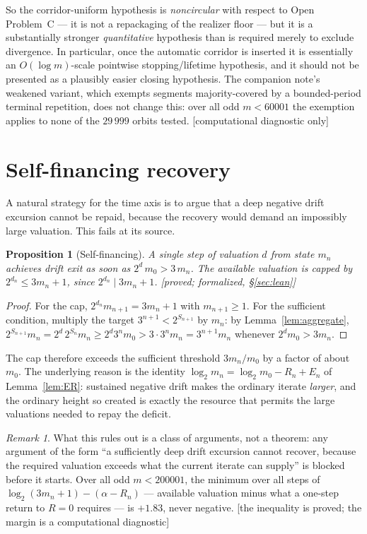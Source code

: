 \documentclass[11pt]{article}
\theoremstyle{plain}
\newtheorem{proposition}[theorem]{Proposition}
\theoremstyle{definition}
\theoremstyle{remark}
\newtheorem{remark}[theorem]{Remark}
\newcommand{\al}{\alpha}
\newcommand{\status}[1]{\textsf{\footnotesize[#1]}}
\begin{document}
So the corridor-uniform hypothesis is \emph{noncircular} with respect to Open Problem~C --- it is
not a repackaging of the realizer floor --- but it is a substantially stronger \emph{quantitative}
hypothesis than is required merely to exclude divergence. In particular, once the automatic
corridor is inserted it is essentially an $O(\log m)$-scale pointwise stopping/lifetime hypothesis,
and it should not be presented as a plausibly easier closing hypothesis. The
companion note's weakened variant, which exempts segments majority-covered by a bounded-period
terminal repetition, does not change this: over all odd $m<60001$ the exemption applies to none of
the $29\,999$ orbits tested. \status{computational diagnostic only}

\section{Self-financing recovery}\label{sec:selffin}

A natural strategy for the time axis is to argue that a deep negative drift excursion cannot be
repaid, because the recovery would demand an impossibly large valuation. This fails at its source.

\begin{proposition}[Self-financing]\label{prop:selffin}
A single step of valuation $d$ from state $m_n$ achieves drift exit as soon as
$2^{d}\,m_0>3\,m_n$. The available valuation is capped by $2^{d_n}\le 3m_n+1$, since
$2^{d_n}\mid 3m_n+1$. \status{proved; formalized, \S\ref{sec:lean}}
\end{proposition}

\begin{proof}
For the cap, $2^{d_n}m_{n+1}=3m_n+1$ with $m_{n+1}\ge1$. For the sufficient condition, multiply the
target $3^{n+1}<2^{S_{n+1}}$ by $m_n$: by Lemma~\ref{lem:aggregate},
$2^{S_{n+1}}m_n=2^{d}\,2^{S_n}m_n\ge 2^{d}3^nm_0>3\cdot3^nm_n=3^{n+1}m_n$ whenever
$2^dm_0>3m_n$.
\end{proof}

The cap therefore exceeds the sufficient threshold $3m_n/m_0$ by a factor of about $m_0$. The
underlying reason is the identity $\log_2 m_n=\log_2 m_0-R_n+E_n$ of Lemma~\ref{lem:ER}: sustained
negative drift makes the ordinary iterate \emph{larger}, and the ordinary height so created is
exactly the resource that permits the large valuations needed to repay the deficit.

\begin{remark}\label{rem:selffin}
What this rules out is a class of arguments, not a theorem: any argument of the form ``a
sufficiently deep drift excursion cannot recover, because the required valuation exceeds what the
current iterate can supply'' is blocked before it starts. Over all odd $m<200001$, the minimum over
all steps of $\log_2(3m_n+1)-(\al-R_n)$ --- available valuation minus what a one-step return to
$R=0$ requires --- is $+1.83$, never negative. \status{the inequality is proved; the margin is a
computational diagnostic}
\end{remark}
\end{document}
